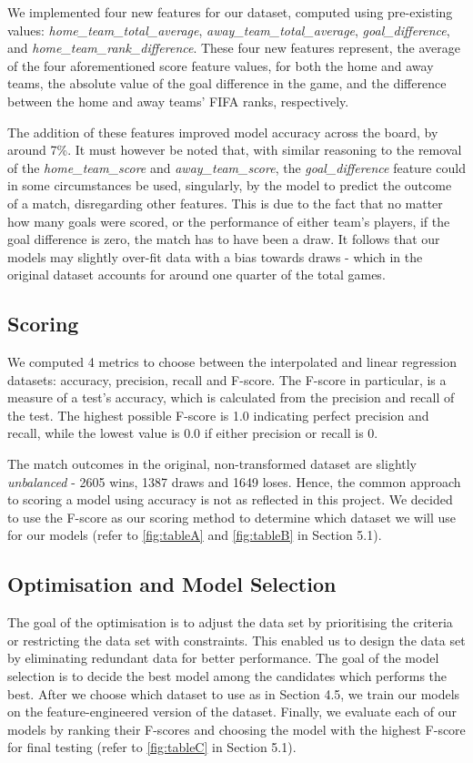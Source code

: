 \documentclass[8pt]{article}
\begin{document}
We implemented four new features for our dataset, computed using pre-existing values: \textit{home\_team\_total\_average}, \textit{away\_team\_total\_average}, \textit{goal\_difference}, and \textit{home\_team\_rank\_difference}. These four new features represent, the average of the four aforementioned score feature values, for both the home and away teams, the absolute value of the goal difference in the game, and the difference between the home and away teams' FIFA ranks, respectively. 

The addition of these features improved model accuracy across the board, by around 7\%. It must however be noted that, with similar reasoning to the removal of the \textit{home\_team\_score} and \textit{away\_team\_score}, the \textit{goal\_difference} feature could in some circumstances be used, singularly, by the model to predict the outcome of a match, disregarding other features. This is due to the fact that no matter how many goals were scored, or the performance of either team's players, if the goal difference is zero, the match has to have been a draw. It follows that our models may slightly over-fit data with a bias towards draws - which in the original dataset accounts for around one quarter of the total games.

\subsection{Scoring}
We computed 4 metrics to choose between the interpolated and linear regression datasets: accuracy, precision, recall and F-score. The F-score in particular, is a measure of a test's accuracy, which is calculated from the precision and recall of the test. The highest possible F-score is 1.0 indicating perfect precision and recall, while the lowest value is 0.0 if either precision or recall is 0.

The match outcomes in the original, non-transformed dataset are slightly \textit{unbalanced} - 2605 wins, 1387 draws and 1649 loses. Hence, the common approach to scoring a model using accuracy is not as reflected in this project. We decided to use the F-score as our scoring method to determine which dataset we will use for our models (refer to \ref{fig:tableA} and \ref{fig:tableB} in Section 5.1).

\subsection{Optimisation and Model Selection}
The goal of the optimisation is to adjust the data set by prioritising the criteria or restricting the data set with constraints. This enabled us to design the data set by eliminating redundant data for better performance. The goal of the model selection is to decide the best model among the candidates which performs the best. After we choose which dataset to use as in Section 4.5, we train our models on the feature-engineered version of the dataset. Finally, we evaluate each of our models by ranking their F-scores and choosing the model with the highest F-score for final testing (refer to \ref{fig:tableC} in Section 5.1).
\end{document}
